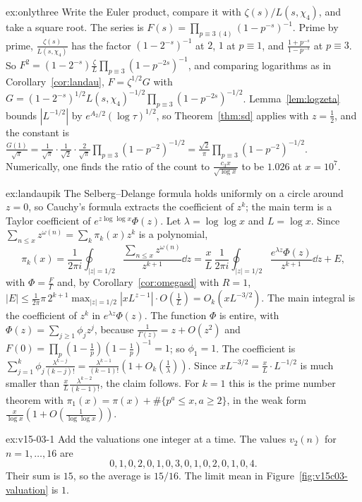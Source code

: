 \begin{solution}{ex:onlythree}
\idea Write the Euler product, compare it with $\zeta(s)/L(s,\chi_4)$, and take a square root.
\writeup The series is $F(s)=\prod_{p\equiv3\ (4)}(1-p^{-s})^{-1}$. Prime by prime, $\frac{\zeta(s)}{L(s,\chi_4)}$ has the factor $(1-2^{-s})^{-1}$ at $2$, $1$ at $p\equiv1$, and $\frac{1+p^{-s}}{1-p^{-s}}$ at $p\equiv3$. So $F^2=(1-2^{-s})\frac\zeta L\prod_{p\equiv3}(1-p^{-2s})^{-1}$, and comparing logarithms as in Corollary~\ref{cor:landau}, $F=\zeta^{1/2}G$ with $G=(1-2^{-s})^{1/2}L(s,\chi_4)^{-1/2}\prod_{p\equiv3}(1-p^{-2s})^{-1/2}$. Lemma~\ref{lem:logzeta} bounds $|L^{-1/2}|$ by $e^{A_2/2}(\log\tau)^{1/2}$, so Theorem~\ref{thm:sd} applies with $z=\frac12$, and the constant is $\frac{G(1)}{\sqrt\pi}=\frac1{\sqrt\pi}\cdot\frac1{\sqrt2}\cdot\frac2{\sqrt\pi}\prod_{p\equiv3}(1-p^{-2})^{-1/2}=\frac{\sqrt2}\pi\prod_{p\equiv3}(1-p^{-2})^{-1/2}$. Numerically, one finds the ratio of the count to $\frac{c_3x}{\sqrt{\log x}}$ to be $1.026$ at $x=10^7$.
\end{solution}

\begin{solution}{ex:landaupik}
\idea The Selberg--Delange formula holds uniformly on a circle around $z=0$, so Cauchy's formula extracts the coefficient of $z^k$; the main term is a Taylor coefficient of $e^{z\log\log x}\Phi(z)$.
\writeup Let $\lambda=\log\log x$ and $L=\log x$. Since $\sum_{n\le x}z^{\omega(n)}=\sum_k\pi_k(x)z^k$ is a polynomial,
\[
\pi_k(x)=\frac1{2\pi i}\oint_{|z|=1/2}\frac{\sum_{n\le x}z^{\omega(n)}}{z^{k+1}}\dd z=\frac xL\,\frac1{2\pi i}\oint_{|z|=1/2}\frac{e^{\lambda z}\Phi(z)}{z^{k+1}}\dd z+E,
\]
with $\Phi=\frac F\Gamma$ and, by Corollary~\ref{cor:omegasd} with $R=1$, $|E|\le\frac1{2\pi}\pi\,2^{k+1}\max_{|z|=1/2}|xL^{z-1}|\cdot O(\frac1L)=O_k(xL^{-3/2})$. The main integral is the coefficient of $z^k$ in $e^{\lambda z}\Phi(z)$. The function $\Phi$ is entire, with $\Phi(z)=\sum_{j\ge1}\phi_jz^j$, because $\frac1{\Gamma(z)}=z+O(z^2)$ and $F(0)=\prod_p(1-\frac1p)(1-\frac1p)^{-1}=1$; so $\phi_1=1$. The coefficient is $\sum_{j=1}^k\phi_j\frac{\lambda^{k-j}}{(k-j)!}=\frac{\lambda^{k-1}}{(k-1)!}(1+O_k(\frac1\lambda))$. Since $xL^{-3/2}=\frac xL\cdot L^{-1/2}$ is much smaller than $\frac xL\frac{\lambda^{k-2}}{(k-1)!}$, the claim follows. For $k=1$ this is the prime number theorem with $\pi_1(x)=\pi(x)+\#\{p^a\le x,a\ge2\}$, in the weak form $\frac x{\log x}(1+O(\frac1{\log\log x}))$.
\end{solution}

\begin{solution}{ex:v15-03-1}
\idea Add the valuations one integer at a time.
\writeup The values \(v_2(n)\) for \(n=1,\dots,16\) are
\[
0,1,0,2,0,1,0,3,0,1,0,2,0,1,0,4.
\]
Their sum is \(15\), so the average is \(15/16\). The limit mean in Figure~\ref{fig:v15c03-valuation} is \(1\).
\end{solution}

